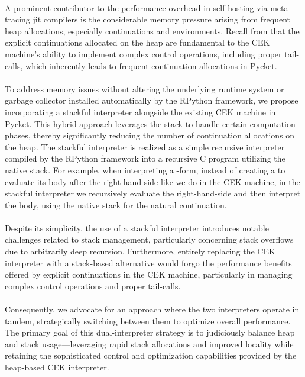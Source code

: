     \paragraph{}%
      A prominent contributor to the performance overhead in self-hosting via meta-tracing \gls{jit} compilers is the considerable memory pressure arising from frequent heap allocations, especially continuations and environments. Recall from  that the explicit continuations allocated on the heap are fundamental to the CEK machine's ability to implement complex control operations, including proper tail-calls, which inherently leads to frequent continuation allocations in Pycket.

    \paragraph{}%
      To address memory issues without altering the underlying runtime system or garbage collector installed automatically by the RPython framework, we propose incorporating a stackful interpreter alongside the existing CEK machine in Pycket. This hybrid approach leverages the stack to handle certain computation phases, thereby significantly reducing the number of continuation allocations on the heap. The stackful interpreter is realized as a simple recursive interpreter compiled by the RPython framework into a recursive C program utilizing the native stack. For example, when interpreting a -form, instead of creating a  to evaluate its body after the right-hand-side like we do in the CEK machine, in the stackful interpreter we recursively evaluate the right-hand-side and then interpret the body, using the native stack for the natural continuation.

    \paragraph{}%
      Despite its simplicity, the use of a stackful interpreter introduces notable challenges related to stack management, particularly concerning stack overflows due to arbitrarily deep recursion. Furthermore, entirely replacing the CEK interpreter with a stack-based alternative would forgo the performance benefits offered by explicit continuations in the CEK machine, particularly in managing complex control operations and proper tail-calls.

    \paragraph{}%
      Consequently, we advocate for an approach where the two interpreters operate in tandem, strategically switching between them to optimize overall performance. The primary goal of this dual-interpreter strategy is to judiciously balance heap and stack usage—leveraging rapid stack allocations and improved locality while retaining the sophisticated control and optimization capabilities provided by the heap-based CEK interpreter.


